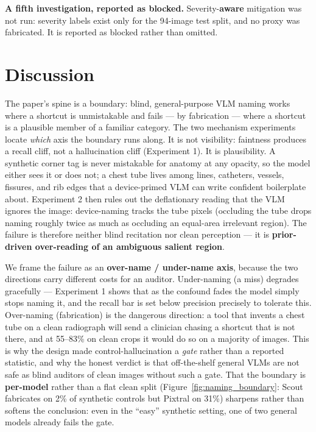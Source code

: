 \documentclass{ieeeaccess}
\begin{document}
\textbf{A fifth investigation, reported as blocked.} Severity-\textbf{aware} mitigation was not run: severity labels exist only for the 94-image test split, and no proxy was fabricated. It is reported as blocked rather than omitted.

\section{Discussion}
The paper's spine is a boundary: blind, general-purpose VLM naming works where a shortcut is unmistakable and fails --- by fabrication --- where a shortcut is a plausible member of a familiar category. The two mechanism experiments locate \emph{which} axis the boundary runs along. It is not visibility: faintness produces a recall cliff, not a hallucination cliff (Experiment 1). It is plausibility. A synthetic corner tag is never mistakable for anatomy at any opacity, so the model either sees it or does not; a chest tube lives among lines, catheters, vessels, fissures, and rib edges that a device-primed VLM can write confident boilerplate about. Experiment 2 then rules out the deflationary reading that the VLM ignores the image: device-naming tracks the tube pixels (occluding the tube drops naming roughly twice as much as occluding an equal-area irrelevant region). The failure is therefore neither blind recitation nor clean perception --- it is \textbf{prior-driven over-reading of an ambiguous salient region}.

We frame the failure as an \textbf{over-name / under-name axis}, because the two directions carry different costs for an auditor. Under-naming (a miss) degrades gracefully --- Experiment 1 shows that as the confound fades the model simply stops naming it, and the recall bar is set below precision precisely to tolerate this. Over-naming (fabrication) is the dangerous direction: a tool that invents a chest tube on a clean radiograph will send a clinician chasing a shortcut that is not there, and at 55--83\% on clean crops it would do so on a majority of images. This is why the design made control-hallucination a \emph{gate} rather than a reported statistic, and why the honest verdict is that off-the-shelf general VLMs are not safe as blind auditors of clean images without such a gate. That the boundary is \textbf{per-model} rather than a flat clean split (Figure~\ref{fig:naming_boundary}: Scout fabricates on 2\% of synthetic controls but Pixtral on 31\%) sharpens rather than softens the conclusion: even in the ``easy'' synthetic setting, one of two general models already fails the gate.
\end{document}
